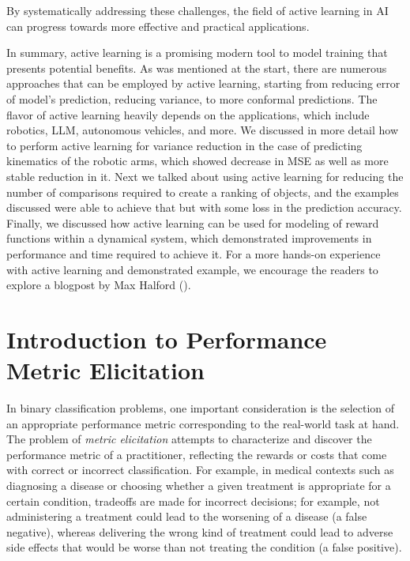 \documentclass[
  letterpaper,
  numbers=noenddot,
  DIV=11,
  oneside]{scrreprt}
\theoremstyle{remark}
\begin{document}
By systematically addressing these challenges, the field of active
learning in AI can progress towards more effective and practical
applications.

In summary, active learning is a promising modern tool to model training
that presents potential benefits. As was mentioned at the start, there
are numerous approaches that can be employed by active learning,
starting from reducing error of model's prediction, reducing variance,
to more conformal predictions. The flavor of active learning heavily
depends on the applications, which include robotics, LLM, autonomous
vehicles, and more. We discussed in more detail how to perform active
learning for variance reduction in the case of predicting kinematics of
the robotic arms, which showed decrease in MSE as well as more stable
reduction in it. Next we talked about using active learning for reducing
the number of comparisons required to create a ranking of objects, and
the examples discussed were able to achieve that but with some loss in
the prediction accuracy. Finally, we discussed how active learning can
be used for modeling of reward functions within a dynamical system,
which demonstrated improvements in performance and time required to
achieve it. For a more hands-on experience with active learning and
demonstrated example, we encourage the readers to explore a blogpost by
Max Halford ().

\section{Introduction to Performance Metric
Elicitation}\label{introduction-to-performance-metric-elicitation}

In binary classification problems, one important consideration is the
selection of an appropriate performance metric corresponding to the
real-world task at hand. The problem of \emph{metric elicitation}
attempts to characterize and discover the performance metric of a
practitioner, reflecting the rewards or costs that come with correct or
incorrect classification. For example, in medical contexts such as
diagnosing a disease or choosing whether a given treatment is
appropriate for a certain condition, tradeoffs are made for incorrect
decisions; for example, not administering a treatment could lead to the
worsening of a disease (a false negative), whereas delivering the wrong
kind of treatment could lead to adverse side effects that would be worse
than not treating the condition (a false positive).
\end{document}

